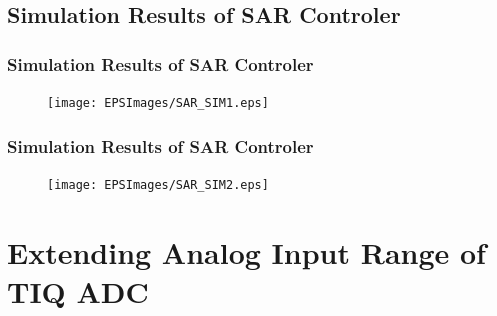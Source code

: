 \subsection*{Simulation Results of SAR Controler}
\begin{frame}
	\frametitle{Simulation Results of SAR Controler}
	\begin{center}
		\begin{figure}
		\texttt{[image: EPSImages/SAR\_SIM1.eps]}\\
		\end{figure}
	\end{center}
\end{frame}
\begin{frame}
	\frametitle{Simulation Results of SAR Controler}
	\begin{center}
		\begin{figure}
		\texttt{[image: EPSImages/SAR\_SIM2.eps]}\\
		\end{figure}
	\end{center}
\end{frame}
\section{Extending Analog Input Range of TIQ ADC }

